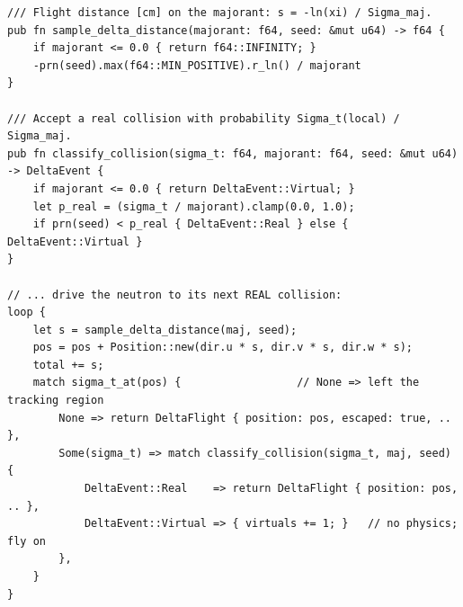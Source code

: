 \documentclass[11pt]{article}
\begin{document}
\begin{lstlisting}[caption={Delta (Woodcock) tracking. The flight is sampled on a
  majorant $\Sigma_{\mathrm{maj}} \geq \Sigma_t(\mathbf{r})$ everywhere, so the
  neutron crosses material boundaries without stopping at them; the resulting
  bias is removed exactly by rejecting a fraction $1 - \Sigma_t/\Sigma_{\mathrm{maj}}$
  of collisions as virtual. No geometric approximation is made.},
  label={lst:delta}]
/// Flight distance [cm] on the majorant: s = -ln(xi) / Sigma_maj.
pub fn sample_delta_distance(majorant: f64, seed: &mut u64) -> f64 {
    if majorant <= 0.0 { return f64::INFINITY; }
    -prn(seed).max(f64::MIN_POSITIVE).r_ln() / majorant
}

/// Accept a real collision with probability Sigma_t(local) / Sigma_maj.
pub fn classify_collision(sigma_t: f64, majorant: f64, seed: &mut u64) -> DeltaEvent {
    if majorant <= 0.0 { return DeltaEvent::Virtual; }
    let p_real = (sigma_t / majorant).clamp(0.0, 1.0);
    if prn(seed) < p_real { DeltaEvent::Real } else { DeltaEvent::Virtual }
}

// ... drive the neutron to its next REAL collision:
loop {
    let s = sample_delta_distance(maj, seed);
    pos = pos + Position::new(dir.u * s, dir.v * s, dir.w * s);
    total += s;
    match sigma_t_at(pos) {                  // None => left the tracking region
        None => return DeltaFlight { position: pos, escaped: true, .. },
        Some(sigma_t) => match classify_collision(sigma_t, maj, seed) {
            DeltaEvent::Real    => return DeltaFlight { position: pos, .. },
            DeltaEvent::Virtual => { virtuals += 1; }   // no physics; fly on
        },
    }
}
\end{lstlisting}

\vspace{1em}
\end{document}
